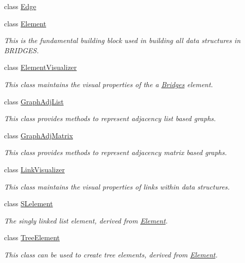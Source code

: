 \begin{DoxyCompactItemize}
class \hyperlink{classbridges_1_1_edge}{Edge}
\item 
class \hyperlink{classbridges_1_1_element}{Element}
\begin{DoxyCompactList}\small\item\em This is the fundamental building block used in building all data structures in B\+R\+I\+D\+G\+E\+S. \end{DoxyCompactList}\item 
class \hyperlink{classbridges_1_1_element_visualizer}{Element\+Visualizer}
\begin{DoxyCompactList}\small\item\em This class maintains the visual properties of the a \hyperlink{namespacebridges_1_1_bridges}{Bridges} element. \end{DoxyCompactList}\item 
class \hyperlink{classbridges_1_1_graph_adj_list}{Graph\+Adj\+List}
\begin{DoxyCompactList}\small\item\em This class provides methods to represent adjacency list based graphs. \end{DoxyCompactList}\item 
class \hyperlink{classbridges_1_1_graph_adj_matrix}{Graph\+Adj\+Matrix}
\begin{DoxyCompactList}\small\item\em This class provides methods to represent adjacency matrix based graphs. \end{DoxyCompactList}\item 
class \hyperlink{classbridges_1_1_link_visualizer}{Link\+Visualizer}
\begin{DoxyCompactList}\small\item\em This class maintains the visual properties of links within data structures. \end{DoxyCompactList}\item 
class \hyperlink{classbridges_1_1_s_lelement}{S\+Lelement}
\begin{DoxyCompactList}\small\item\em The singly linked list element, derived from \hyperlink{classbridges_1_1_element}{Element}. \end{DoxyCompactList}\item 
class \hyperlink{classbridges_1_1_tree_element}{Tree\+Element}
\begin{DoxyCompactList}\small\item\em This class can be used to create tree elements, derived from \hyperlink{classbridges_1_1_element}{Element}. \end{DoxyCompactList}\end{DoxyCompactItemize}

